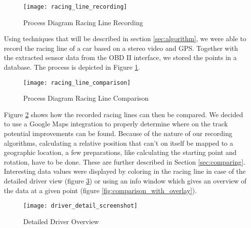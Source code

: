 \begin{figure}[!ht]
		\centering
		\texttt{[image: racing\_line\_recording]}
		\caption{Process Diagram Racing Line Recording}
		\label{fig:racing_line_recording}
\end{figure}

Using techniques that will be described in section \ref{sec:algorithm}, we were able to record the racing line of a car based on a stereo video and GPS. Together with the extracted sensor data from the OBD II interface, we stored the points in a database. The process is depicted in Figure \ref{fig:racing_line_recording}.

\begin{figure}[!ht]
	\centering
	\texttt{[image: racing\_line\_comparison]}
	\caption{Process Diagram Racing Line Comparison}
	\label{fig:racing_line_comparison}
\end{figure}

Figure \ref{fig:racing_line_comparison} shows how the recorded racing lines can then be compared. We decided to use a Google Maps integration to properly determine where on the track potential improvements can be found. Because of the nature of our recording algorithms, calculating a relative position that can't on itself be mapped to a geographic location, a few preparations, like calculating the starting point and rotation, have to be done. These are further described in Section \ref{sec:comparing}. Interesting data values were displayed by coloring in the racing line in case of the detailed driver view (figure \ref{fig:driver_detail}) or using an info window which gives an overview of the data at a given point (figure \ref{fig:comparison_with_overlay}).

\begin{figure}[!ht]
	\texttt{[image: driver\_detail\_screenshot]}
	\caption{Detailed Driver Overview}
	\label{fig:driver_detail}
\end{figure}

\clearpage